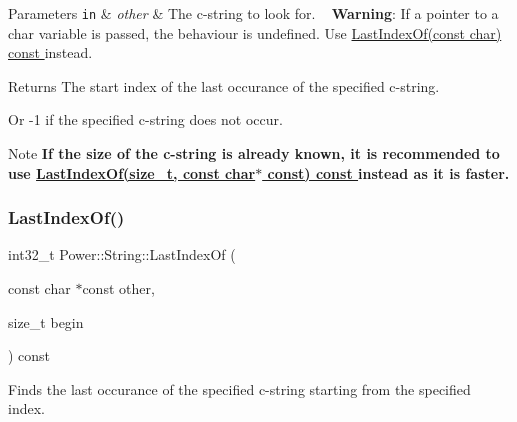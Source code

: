 \begin{DoxyParams}[1]{Parameters}
\mbox{\tt in}  & {\em other} & The c-\/string to look for. ~\newline
 {\bfseries Warning}\+: If a pointer to a char variable is passed, the behaviour is undefined. Use \hyperlink{class_power_1_1_string_ad4c89be895074a3f2ad0b67d7747e1c8}{Last\+Index\+Of(const char) const }instead. \\
\hline
\end{DoxyParams}
\begin{DoxyReturn}{Returns}
The start index of the last occurance of the specified c-\/string. 

Or -\/1 if the specified c-\/string does not occur. 
\end{DoxyReturn}
\begin{DoxyNote}{Note}
{\bfseries If the size of the c-\/string is already known, it is recommended to use \hyperlink{class_power_1_1_string_a99e11257d4759d99cec53f8ef4db0145}{Last\+Index\+Of(size\+\_\+t, const char$\ast$ const) const }instead as it is faster.} 
\end{DoxyNote}
\mbox{\label{class_power_1_1_string_af029a026b7bd182e573809b826b2c35c}} 
\subsubsection{\texorpdfstring{Last\+Index\+Of()}{LastIndexOf()}\hspace{0.1cm}{\footnotesize\ttfamily [5/12]}}
{\footnotesize\ttfamily int32\+\_\+t Power\+::\+String\+::\+Last\+Index\+Of (\begin{DoxyParamCaption}\item[{const char $\ast$const}]{other,  }\item[{size\+\_\+t}]{begin }\end{DoxyParamCaption}) const\hspace{0.3cm}{\ttfamily [inline]}}



Finds the last occurance of the specified c-\/string starting from the specified index. 


